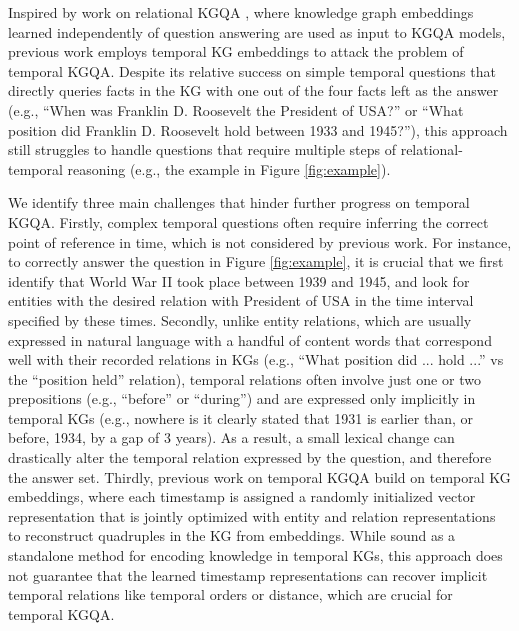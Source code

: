 \documentclass[11pt]{article}
\begin{document}
Inspired by work on relational KGQA \citep{huang2019knowledge, saxena2020improving}, where knowledge graph embeddings \cite{dasgupta2018hyte, garcia2018learning, goel2020diachronic, wu2020temp, lacroix2020tensor} learned independently of question answering are used as input to KGQA models, previous work \cite{saxena2021question} employs temporal KG embeddings to attack the problem of temporal KGQA.
Despite its relative success on simple temporal questions that directly queries facts in the KG with one out of the four facts left as the answer (e.g., ``When was Franklin D. Roosevelt the President of USA?'' or ``What position did Franklin D. Roosevelt hold between 1933 and 1945?''), this approach still struggles to handle questions that require multiple steps of relational-temporal reasoning (e.g., the example in Figure \ref{fig:example}).
 
We identify three main challenges that hinder further progress on temporal KGQA.
Firstly, complex temporal questions often require inferring the correct point of reference in time, which is not considered by previous work.
For instance, to correctly answer the question in Figure \ref{fig:example}, it is crucial that we first identify that World War II took place between 1939 and 1945, and look for entities with the desired relation with President of USA in the time interval specified by these times.
Secondly, unlike entity relations, which are usually expressed in natural language with a handful of content words that correspond well with their recorded relations in KGs (e.g., ``What position did ... hold ...'' vs the ``position held'' relation), temporal relations often involve just one or two prepositions (e.g., ``before'' or ``during'') and are expressed only implicitly in temporal KGs (e.g., nowhere is it clearly stated that 1931 is earlier than, or before, 1934, by a gap of 3 years).
As a result, a small lexical change can drastically alter the temporal relation expressed by the question, and therefore the answer set.
Thirdly, previous work on temporal KGQA build on temporal KG embeddings, where each timestamp is assigned a randomly initialized vector representation that is jointly optimized with entity and relation representations to reconstruct quadruples in the KG from embeddings.
While sound as a standalone method for encoding knowledge in temporal KGs, this approach does not guarantee that the learned timestamp representations can recover implicit temporal relations like temporal orders or distance, which are crucial for temporal KGQA.
\end{document}
